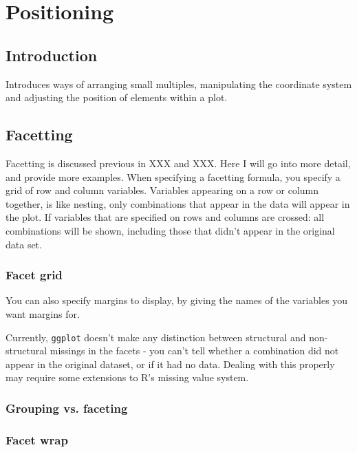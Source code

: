 
\chapter{Positioning}
\label{cha:position}

\section{Introduction}

Introduces ways of arranging small multiples, manipulating the coordinate system and adjusting the position of elements within a plot.

\section{Facetting}\label{sec:facetting}

Facetting is discussed previous in XXX and XXX.  Here I will go into more detail, and provide more examples.  When specifying a facetting formula, you specify a grid of row and column variables.  Variables appearing on a row or column together, is like nesting, only combinations that appear in the data will appear in the plot.  If variables that are specified on rows and columns are crossed: all combinations will be shown, including those that didn't appear in the original data set.  

\subsection{Facet grid}

You can also specify margins to display, by giving the names of the variables you want margins for.  


Currently, {\tt ggplot} doesn't make any distinction between structural and non-structural missings in the facets - you can't tell whether a combination did not appear in the original dataset, or if it had no data.  Dealing with this properly may require some extensions to R's missing value system.  

\subsection{Grouping vs. faceting}


\subsection{Facet wrap}

